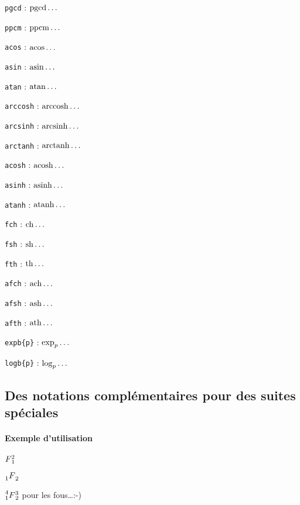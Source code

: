 \documentclass[12pt,a4paper]{article}
\theoremstyle{definition}
\begin{document}
\begin{multicols}{2}
\verb+pgcd+ : $\pgcd\dots$

\verb+ppcm+ : $\ppcm\dots$

\verb+acos+ : $\acos\dots$

\verb+asin+ : $\asin\dots$

\verb+atan+ : $\atan\dots$

\verb+arccosh+ : $\arccosh\dots$

\verb+arcsinh+ : $\arcsinh\dots$

\verb+arctanh+ : $\arctanh\dots$

\verb+acosh+ : $\acosh\dots$

\verb+asinh+ : $\asinh\dots$

\verb+atanh+ : $\atanh\dots$

\verb+fch+ : $\fch\dots$

\verb+fsh+ : $\fsh\dots$

\verb+fth+ : $\fth\dots$

\verb+afch+ : $\afch\dots$

\verb+afsh+ : $\afsh\dots$

\verb+afth+ : $\afth\dots$

\verb+expb{p}+ : $\expb{p}\dots$

\verb+logb{p}+ : $\logb{p}\dots$
\end{multicols}

\subsection{Des notations complémentaires pour des suites spéciales}

\paragraph{Exemple d'utilisation}

\begin{latexex}
$\seqplus{F}{1}{2}$

$\seqhypergeo{F}{1}{2}$

$\seqsuprageo{F}{1}{2}{3}{4}$
pour les fous\dots :-)
\end{latexex}


\end{document}
